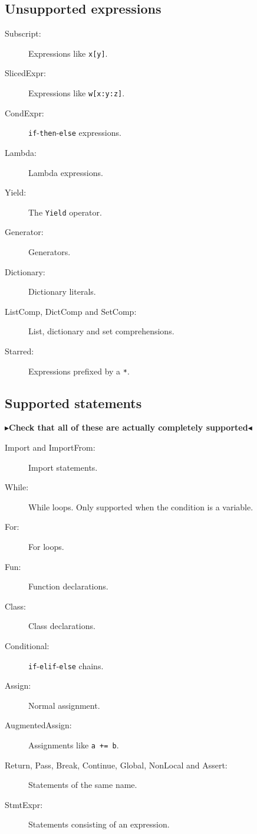 \documentclass[11pt]{report}
\newcommand{\todo}[1]{{\color[rgb]{.5,0,0}\textbf{$\blacktriangleright$#1$\blacktriangleleft$}}}
\begin{document}
\subsection{Unsupported expressions}
\begin{description}
  \item[Subscript:] Expressions like \verb|x[y]|.
  \item[SlicedExpr:] Expressions like \verb|w[x:y:z]|.
  \item[CondExpr:] \verb|if|-\verb|then|-\verb|else| expressions.
  \item[Lambda:] Lambda expressions.
  \item[Yield:] The \verb|Yield| operator.
  \item[Generator:] Generators.
  \item[Dictionary:] Dictionary literals.
  \item[ListComp, DictComp and SetComp:] List, dictionary and set
    comprehensions.
  \item[Starred:] Expressions prefixed by a \verb|*|.
\end{description}

\subsection{Supported statements}
\todo{Check that all of these are actually completely supported}
\begin{description}
  \item[Import and ImportFrom:] Import statements.
  \item[While:] While loops. Only supported when the condition is a variable.
  \item[For:] For loops.
  \item[Fun:] Function declarations.
  \item[Class:] Class declarations.
  \item[Conditional:] \verb|if|-\verb|elif|-\verb|else| chains.
  \item[Assign:] Normal assignment.
  \item[AugmentedAssign:] Assignments like \verb|a += b|.
  \item[Return, Pass, Break, Continue, Global, NonLocal and Assert:] Statements of the same name.
  \item[StmtExpr:] Statements consisting of an expression.
\end{description}
\end{document}
